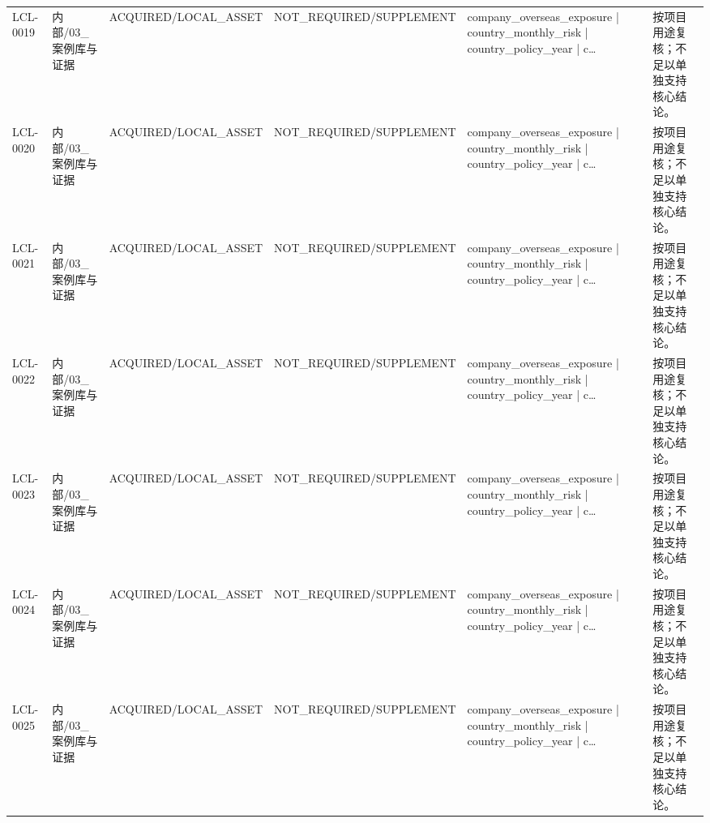 \begin{landscape}
\begin{longtable}{p{1.8cm}p{2.6cm}p{2.6cm}p{2.6cm}p{4.8cm}p{7.2cm}}
LCL-0019 & 内部/\allowbreak{}03\_\allowbreak{}案例库与证据 & ACQUIRED/\allowbreak{}LOCAL\_\allowbreak{}ASSET & NOT\_\allowbreak{}REQUIRED/\allowbreak{}SUPPLEMENT & company\_\allowbreak{}overseas\_\allowbreak{}exposure | country\_\allowbreak{}monthly\_\allowbreak{}risk | country\_\allowbreak{}policy\_\allowbreak{}year | c… & 按项目用途复核；不足以单独支持核心结论。\\
LCL-0020 & 内部/\allowbreak{}03\_\allowbreak{}案例库与证据 & ACQUIRED/\allowbreak{}LOCAL\_\allowbreak{}ASSET & NOT\_\allowbreak{}REQUIRED/\allowbreak{}SUPPLEMENT & company\_\allowbreak{}overseas\_\allowbreak{}exposure | country\_\allowbreak{}monthly\_\allowbreak{}risk | country\_\allowbreak{}policy\_\allowbreak{}year | c… & 按项目用途复核；不足以单独支持核心结论。\\
LCL-0021 & 内部/\allowbreak{}03\_\allowbreak{}案例库与证据 & ACQUIRED/\allowbreak{}LOCAL\_\allowbreak{}ASSET & NOT\_\allowbreak{}REQUIRED/\allowbreak{}SUPPLEMENT & company\_\allowbreak{}overseas\_\allowbreak{}exposure | country\_\allowbreak{}monthly\_\allowbreak{}risk | country\_\allowbreak{}policy\_\allowbreak{}year | c… & 按项目用途复核；不足以单独支持核心结论。\\
LCL-0022 & 内部/\allowbreak{}03\_\allowbreak{}案例库与证据 & ACQUIRED/\allowbreak{}LOCAL\_\allowbreak{}ASSET & NOT\_\allowbreak{}REQUIRED/\allowbreak{}SUPPLEMENT & company\_\allowbreak{}overseas\_\allowbreak{}exposure | country\_\allowbreak{}monthly\_\allowbreak{}risk | country\_\allowbreak{}policy\_\allowbreak{}year | c… & 按项目用途复核；不足以单独支持核心结论。\\
LCL-0023 & 内部/\allowbreak{}03\_\allowbreak{}案例库与证据 & ACQUIRED/\allowbreak{}LOCAL\_\allowbreak{}ASSET & NOT\_\allowbreak{}REQUIRED/\allowbreak{}SUPPLEMENT & company\_\allowbreak{}overseas\_\allowbreak{}exposure | country\_\allowbreak{}monthly\_\allowbreak{}risk | country\_\allowbreak{}policy\_\allowbreak{}year | c… & 按项目用途复核；不足以单独支持核心结论。\\
LCL-0024 & 内部/\allowbreak{}03\_\allowbreak{}案例库与证据 & ACQUIRED/\allowbreak{}LOCAL\_\allowbreak{}ASSET & NOT\_\allowbreak{}REQUIRED/\allowbreak{}SUPPLEMENT & company\_\allowbreak{}overseas\_\allowbreak{}exposure | country\_\allowbreak{}monthly\_\allowbreak{}risk | country\_\allowbreak{}policy\_\allowbreak{}year | c… & 按项目用途复核；不足以单独支持核心结论。\\
LCL-0025 & 内部/\allowbreak{}03\_\allowbreak{}案例库与证据 & ACQUIRED/\allowbreak{}LOCAL\_\allowbreak{}ASSET & NOT\_\allowbreak{}REQUIRED/\allowbreak{}SUPPLEMENT & company\_\allowbreak{}overseas\_\allowbreak{}exposure | country\_\allowbreak{}monthly\_\allowbreak{}risk | country\_\allowbreak{}policy\_\allowbreak{}year | c… & 按项目用途复核；不足以单独支持核心结论。\\

\end{longtable}
\end{landscape}
